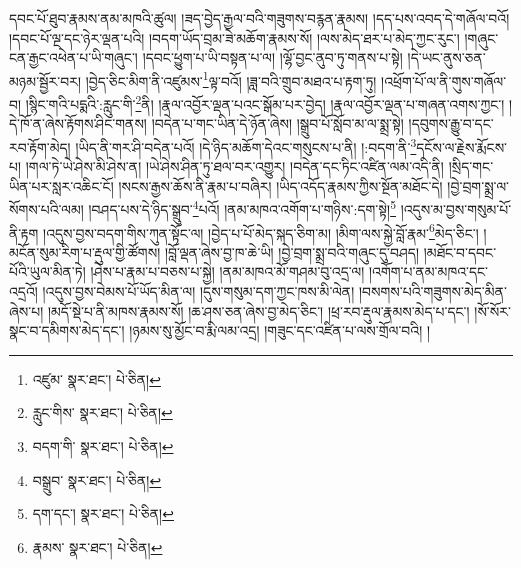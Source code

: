 དབང་པོ་ཐུབ་རྣམས་ནམ་མཁའི་ཚུལ། །ཟད་བྱེད་རྒྱལ་བའི་གཟུགས་བརྙན་རྣམས། །དད་པས་འབད་དེ་གཞོལ་བའོ། །དབང་པོ་ལྔ་དང་ཉེར་ལྡན་པའི། །བདག་ཡོད་བྲམ་ཟེ་མཆོག་རྣམས་སོ། །ལས་མེད་ཐར་པ་མེད་ཀྱང་རུང་། །གཞུང་ངན་རྒྱང་འཕེན་པ་ཡི་གཞུང་། །དབང་ཕྱུག་པ་ཡི་བསྟན་པ་ལ། །ལྷོ་བྱང་ནུབ་ཏུ་གནས་པ་སྟེ། །དེ་ཡང་ནུས་ཅན་མཉམ་སྦྱོར་བར། །བྱེད་ཅིང་མིག་ནི་འཛུམས་\footnote{འཛུམ་  སྣར་ཐང་།  པེ་ཅིན། }ལྟ་བའོ། །ཟླ་བའི་གྲུབ་མཐའ་པ་རྟག་ཏུ། །འཕྲོག་པོ་ལ་ནི་གུས་གཞོལ་བ། །སྙིང་གའི་པདྨའི་:རླུང་གི་\footnote{རླུང་གིས་  སྣར་ཐང་།  པེ་ཅིན། }ནི། །རྣལ་འབྱོར་ལྡན་པའང་སྒོམ་པར་བྱེད། །རྣལ་འབྱོར་ལྡན་པ་གཞན་འགས་ཀྱང་། །དེ་ཁོ་ན་ཞེས་རྟོགས་ཤིང་གནས། །བདེན་པ་གང་ཡིན་དེ་ཉོན་ཞེས། །སྒྲུབ་པོ་སློབ་མ་ལ་སྨྲ་སྟེ། །དབུགས་རྒྱུ་བ་དང་རབ་རྟོག་མེད། །ཡིད་ནི་གར་ཤི་བདེན་པའོ། །དེ་ཉིད་མཆོག་དེའང་གསུངས་པ་ནི། །:བདག་ནི་\footnote{བདག་གི་  སྣར་ཐང་།  པེ་ཅིན། }དངོས་ལ་རྗེས་རྨོངས་པ། །གལ་ཏེ་ཡེ་ཤེས་མི་ཤེས་ན། །ཡེ་ཤེས་ཤིན་ཏུ་ཐལ་བར་འགྱུར། །བདེན་དང་ཏིང་འཛིན་ལམ་འདི་ནི། །སྲིད་གང་ཡིན་པར་སླར་འཆིང་ངོ། །སངས་རྒྱས་ཆོས་ནི་རྣམ་པ་བཞིར། །ཡིད་འདོད་རྣམས་ཀྱིས་སྔོན་མཐོང་དེ། །བྱེ་བྲག་སྨྲ་ལ་སོགས་པའི་ལམ། །བཤད་པས་དེ་ཉིད་སྒྲུབ་\footnote{བསྒྲུབ་  སྣར་ཐང་།  པེ་ཅིན། }པའོ། །ནམ་མཁའ་འགོག་པ་གཉིས་:དག་སྟེ།\footnote{དག་དང་།  སྣར་ཐང་།  པེ་ཅིན། } །འདུས་མ་བྱས་གསུམ་པོ་ནི་རྟག །འདུས་བྱས་བདག་གིས་ཀུན་སྟོང་ལ། །བྱེད་པ་པོ་མེད་སྐད་ཅིག་མ། །མིག་ལས་སྐྱེ་བློ་རྣམ་\footnote{རྣམས་  སྣར་ཐང་།  པེ་ཅིན། }མེད་ཅིང་། །མངོན་སུམ་རིག་པ་རྡུལ་གྱི་ཚོགས། །བློ་ལྡན་ཞེས་བྱ་ཁ་ཆེ་ཡི། །བྱེ་བྲག་སྨྲ་བའི་གཞུང་དུ་བཤད། །མཐོང་བ་དབང་པོའི་ཡུལ་མིན་ཏེ། །ཤེས་པ་རྣམ་པ་བཅས་པ་སྐྱེ། །ནམ་མཁའ་མོ་གཤམ་བུ་འདྲ་ལ། །འགོག་པ་ནམ་མཁའ་དང་འདྲའོ། །འདུས་བྱས་བེམས་པོ་ཡོད་མིན་ལ། །དུས་གསུམ་དག་ཀྱང་ཁས་མི་ལེན། །བསགས་པའི་གཟུགས་མེད་མིན་ཞེས་པ། །མདོ་སྡེ་པ་ནི་མཁས་རྣམས་སོ། །ཆ་ཤས་ཅན་ཞེས་བྱ་མེད་ཅིང་། །ཕྲ་རབ་རྡུལ་རྣམས་མེད་པ་དང་། །སོ་སོར་སྣང་བ་དམིགས་མེད་དང་། །ཉམས་སུ་མྱོང་བ་རྨི་ལམ་འདྲ། །གཟུང་དང་འཛིན་པ་ལས་གྲོལ་བའི། །
